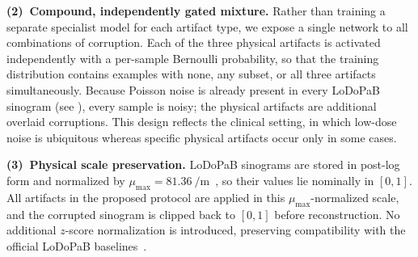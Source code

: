 \textbf{(2)~Compound, independently gated mixture.} Rather than training a separate specialist model for each artifact type, we expose a single network to all combinations of corruption. Each of the three physical artifacts is activated independently with a per-sample Bernoulli probability, so that the training distribution contains examples with none, any subset, or all three artifacts simultaneously. Because Poisson noise is already present in every \mbox{LoDoPaB} sinogram (see ), every sample is noisy; the physical artifacts are additional overlaid corruptions. This design reflects the clinical setting, in which low-dose noise is ubiquitous whereas specific physical artifacts occur only in some cases.

\textbf{(3)~Physical scale preservation.} \mbox{LoDoPaB} sinograms are stored in post-log form and normalized by $\mu_{\max}=\SI{81.36}{\per\metre}$~\cite{Leuschner2021}, so their values lie nominally in $[0,1]$. All artifacts in the proposed protocol are applied in this $\mu_{\max}$-normalized scale, and the corrupted sinogram is clipped back to $[0,1]$ before reconstruction. No additional $z$-score normalization is introduced, preserving compatibility with the official \mbox{LoDoPaB} baselines~\cite{Leuschner2021, Kiss2024}.

